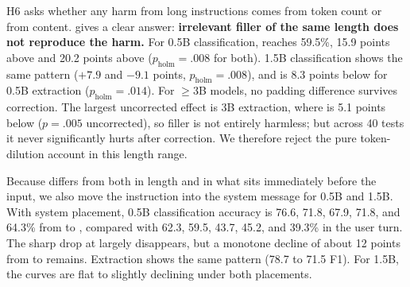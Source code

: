 \begin{table}[t]
\centering
\caption{Padding control. \padded has the content of \standard and the word count of \exhaustive. Differences are in points with 95\% bootstrap CIs; $p_{\text{holm}}$ is corrected over the 40 padding tests. Filler never significantly hurts after correction; for the small models it significantly \emph{helps} relative to \standard, while the content-rich \exhaustive tier is significantly worse than \padded.}
\label{tab:padding}
\end{table}

H6 asks whether any harm from long instructions comes from token count or from content.
 gives a clear answer: {\bf irrelevant filler of the same length does not reproduce the harm.}
For 0.5B classification, \padded reaches 59.5\%, 15.9 points above \standard and 20.2 points above \exhaustive ($p_{\text{holm}}=.008$ for both).
1.5B classification shows the same pattern ($+7.9$ and $-9.1$ points, $p_{\text{holm}}=.008$), and \exhaustive is 8.3 points below \padded for 0.5B extraction ($p_{\text{holm}}=.014$).
For $\geq$3B models, no padding difference survives correction.
The largest uncorrected effect is 3B extraction, where \padded is 5.1 points below \standard ($p=.005$ uncorrected), so filler is not entirely harmless; but across 40 tests it never significantly hurts after correction.
We therefore reject the pure token-dilution account in this length range.

Because \padded differs from \standard both in length and in what sits immediately before the input, we also move the instruction into the system message for 0.5B and 1.5B.
With system placement, 0.5B classification accuracy is 76.6, 71.8, 67.9, 71.8, and 64.3\% from \minimal to \exhaustive, compared with 62.3, 59.5, 43.7, 45.2, and 39.3\% in the user turn.
The sharp drop at \standard largely disappears, but a monotone decline of about 12 points from \minimal to \exhaustive remains.
Extraction shows the same pattern (78.7 to 71.5 F1).
For 1.5B, the curves are flat to slightly declining under both placements.

